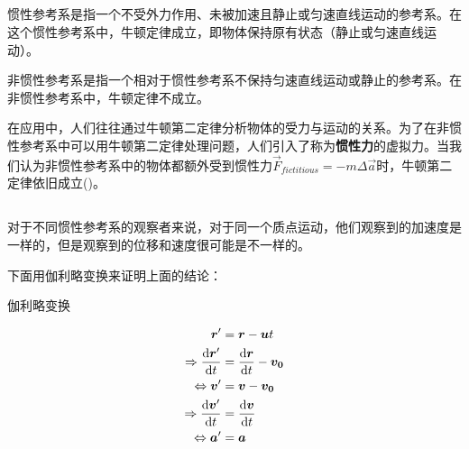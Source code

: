 \subsection[牛顿第三定律]{}
\begin{law}
\end{law}

\subsection[惯性参考系与非惯性参考系]{}
\begin{Itemize}
  \item 惯性参考系是指一个不受外力作用、未被加速且静止或匀速直线运动的参考系。在这个惯性参考系中，牛顿定律成立，即物体保持原有状态（静止或匀速直线运动）。
	\item 非惯性参考系是指一个相对于惯性参考系不保持匀速直线运动或静止的参考系。在非惯性参考系中，牛顿定律不成立\footnotemark。
\end{Itemize}

在应用中，人们往往通过牛顿第二定律分析物体的受力与运动的关系。为了在非惯性参考系中可以用牛顿第二定律处理问题，人们引入了称为\textbf{惯性力}的虚拟力。当我们认为非惯性参考系中的物体都额外受到惯性力$\vec{F}_{fictitious}=-m\Delta\vec{a}$时，牛顿第二定律依旧成立()。


\subsection[惯性系中的相对运动]{}
对于不同惯性参考系的观察者来说，对于同一个质点运动，他们观察到的加速度是一样的，但是观察到的位移和速度很可能是不一样的。

下面用伽利略变换来证明上面的结论：
\begin{center}
	伽利略变换
\end{center}
\begin{equation}
  \begin{aligned}
 \vec{r}'&=\vec{r}-\vec{u}t\\
\Rightarrow \frac{\dif \vec{r}'}{\dif t}&=\frac{\dif \vec{r}}{\dif t}-\vec{v_{0}}\\
\Leftrightarrow \vec{v}'&=\vec{v}-\vec{v_{0}}\\
\Rightarrow \frac{\dif \vec{v}'}{\dif t}&=\frac{\dif \vec{v}}{\dif t}\\
\Leftrightarrow \vec{a}'&=\vec{a}
  \end{aligned}
  \nonumber
\end{equation}

